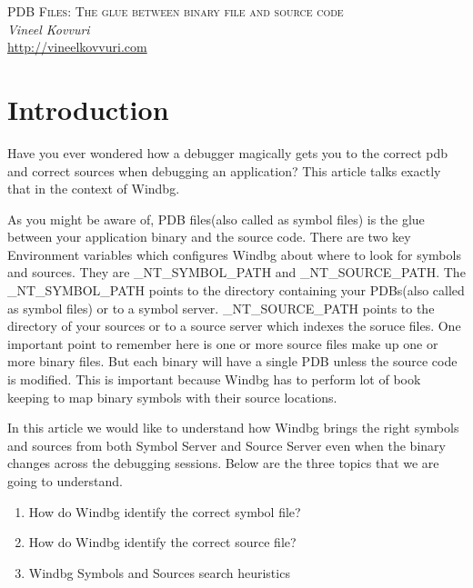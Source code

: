 \documentclass{article}
\begin{document}
\begin{titlepage}
   \begin{center}
      \Large\textsc{PDB Files: The glue between binary file and source code}\\
      \vspace{5mm}
      \Large\textit{Vineel Kovvuri}\\
      \url{http://vineelkovvuri.com}\\
   \end{center}
\end{titlepage}

\tableofcontents

\newpage
\section{Introduction}
Have you ever wondered how a debugger magically gets you to the correct pdb and correct sources when debugging an application? This article talks exactly that in the context of Windbg.

As you might be aware of, PDB files(also called as symbol files) is the glue between your application binary and the source code. There are two key Environment variables which configures Windbg about where to look for symbols and sources. They are \_NT\_SYMBOL\_PATH and \_NT\_SOURCE\_PATH. The \_NT\_SYMBOL\_PATH points to the directory containing your PDBs(also called as symbol files) or to a symbol server. \_NT\_SOURCE\_PATH points to the directory of your sources or to a source server which indexes the soruce files. One important point to remember here is one or more source files make up one or more binary files. But each binary will have a single PDB unless the source code is modified. This is important because Windbg has to perform lot of book keeping to map binary symbols with their source locations.

In this article we would like to understand how Windbg brings the right symbols and sources from both Symbol Server and Source Server even when the binary changes across the debugging sessions. Below are the three topics that we are going to understand.

\begin{enumerate}[noitemsep]
    \item How do Windbg identify the correct symbol file?
    \item How do Windbg identify the correct source file?
    \item Windbg Symbols and Sources search heuristics
\end{enumerate}
\end{document}
